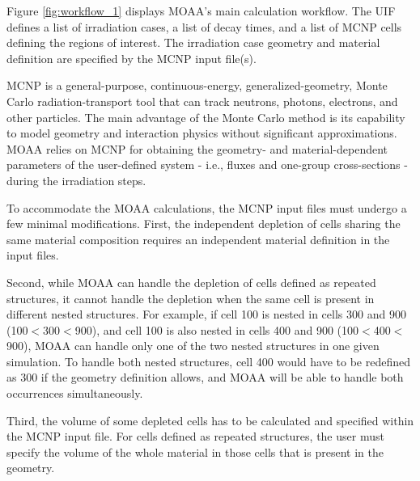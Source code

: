 \documentclass{style/nseJournal}
\begin{document}

Figure \ref{fig:workflow_1} displays MOAA's main calculation workflow.
The \gls*{UIF} defines a list of irradiation cases, a list of decay times, and a list of MCNP cells defining the regions of interest.
The irradiation case geometry and material definition are specified by the MCNP input file(s).

MCNP is a general-purpose, continuous-energy, generalized-geometry, Monte Carlo radiation-transport tool that can track neutrons, photons, electrons, and other particles.
The main advantage of the Monte Carlo method is its capability to model geometry and interaction physics without significant approximations.
MOAA relies on MCNP for obtaining the geometry- and material-dependent parameters of the user-defined system - i.e., fluxes and one-group cross-sections - during the irradiation steps.

To accommodate the MOAA calculations, the MCNP input files must undergo a few minimal modifications.
First, the independent depletion of cells sharing the same material composition requires an independent material definition in the input files.

Second, while MOAA can handle the depletion of cells defined as repeated structures, it cannot handle the depletion when the same cell is present in different nested structures.
For example, if cell 100 is nested in cells 300 and 900 (100$<$300$<$900), and cell 100 is also nested in cells 400 and 900 (100$<$400$<$900), MOAA can handle only one of the two nested structures in one given simulation.
To handle both nested structures, cell 400 would have to be redefined as 300 if the geometry definition allows, and MOAA will be able to handle both occurrences simultaneously.

Third, the volume of some depleted cells has to be calculated and specified within the MCNP input file.
For cells defined as repeated structures, the user must specify the volume of the whole material in those cells that is present in the geometry.
\end{document}
